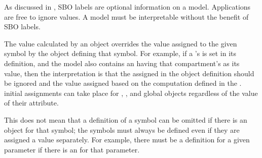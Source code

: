 As discussed in , SBO labels are optional
information on a model.  Applications are free to ignore
 values.  A model must be interpretable without the
benefit of SBO labels.


\label{sec:initial-assignment-semantics}

The value calculated by an \InitialAssignment object overrides the
value assigned to the given symbol by the object defining that
symbol.  For example, if a \Compartment's  is set in
its definition, and the model also contains an \InitialAssignment
having that compartment's  as its  value,
then the interpretation is that the  assigned in the
\Compartment object definition should be ignored and the value
assigned based on the computation defined in the
\InitialAssignment.   initial assignments can take place for
\Compartment, \Species, \SpeciesReference and global \Parameter
objects regardless of the value of their 
attribute.

This does not mean that a definition of a symbol can be omitted if
there is an \InitialAssignment object for that symbol; the symbols
must always be defined even if they are assigned a value
separately.  For example, there must be a \Parameter definition
for a given parameter if there is an \InitialAssignment for that
parameter.

